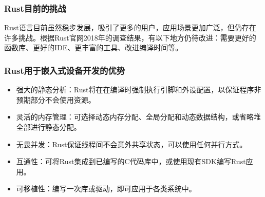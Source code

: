 \documentclass[12pt, a4paper]{article}
\begin{document}
	
	
	\subsubsection{Rust目前的挑战}
	Rust语言目前虽然稳步发展，吸引了更多的用户，应用场景更加广泛，但仍存在许多挑战。根据Rust官网2018年的调查结果，有以下地方仍待改进：需要更好的函数库、更好的IDE、更丰富的工具、改进编译时间等。   
	
	\subsubsection{Rust用于嵌入式设备开发的优势}
	\begin{itemize}
		\item 强大的静态分析：Rust将在在编译时强制执行引脚和外设配置，以保证程序非预期部分不会使用资源。   
		\item 灵活的内存管理：可选择动态内存分配、全局分配和动态数据结构，或省略堆全部进行静态分配。
		\item 无畏并发：Rust保证线程间不会意外共享状态，可以使用任何并行方式。   
		\item 互通性：可将Rust集成到已编写的C代码库中，或使用现有SDK编写Rust应用。
		\item 可移植性：编写一次库或驱动，即可应用于各类系统中。
	\end{itemize}
	
\end{document}
